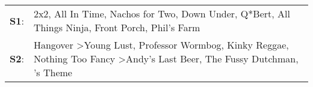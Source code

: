 \begin{supertabular}{p{0.03\textwidth}p{0.92\textwidth}}
 \textbf{S1}:  &                                                    2x2\textsuperscript{}, \enspace All In Time\textsuperscript{}, \enspace Nachos for Two\textsuperscript{}, \enspace Down Under\textsuperscript{}, \enspace Q*Bert\textsuperscript{}, \enspace All Things Ninja\textsuperscript{}, \enspace Front Porch\textsuperscript{}, \enspace Phil's Farm\textsuperscript{}  \enspace  \\
 \textbf{S2}:  &  Hangover\textsuperscript{} \textgreater \enspace Young Lust\textsuperscript{}, \enspace Professor Wormbog\textsuperscript{}, \enspace Kinky Reggae\textsuperscript{}, \enspace Nothing Too Fancy\textsuperscript{} \textgreater \enspace Andy's Last Beer\textsuperscript{}, \enspace The Fussy Dutchman\textsuperscript{}, 's Theme\textsuperscript{}  \enspace  \\
\end{supertabular}
